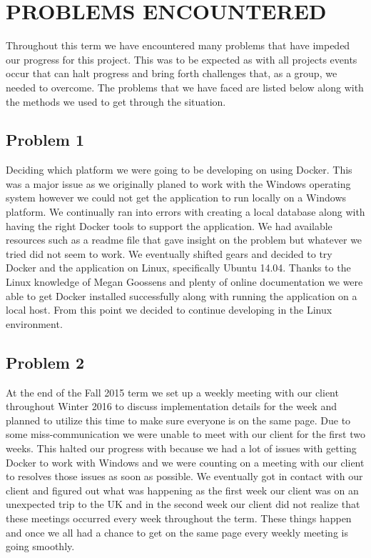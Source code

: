 \documentclass[letterpaper,10pt,onecolumn]{IEEEtran} %
\begin{document}
\section{PROBLEMS ENCOUNTERED}

Throughout this term we have encountered many problems that have impeded our progress for this project. This was to be expected as with all projects events occur that can halt progress and bring forth challenges that, as a group, we needed to overcome. The problems that we have faced are listed below along with the methods we used to get through the situation.

\subsection{Problem 1}
Deciding which platform we were going to be developing on using Docker. This was a major issue as we originally planed to work with the Windows operating system however we could not get the application to run locally on a Windows platform. We continually ran into errors with creating a local database along with having the right Docker tools to support the application. We had available resources such as a readme file that gave insight on the problem but whatever we tried did not seem to work. We eventually shifted gears and decided to try Docker and the application on Linux, specifically Ubuntu 14.04. Thanks to the Linux knowledge of Megan Goossens and plenty of online documentation we were able to get Docker installed successfully along with running the application on a local host. From this point we decided to continue developing in the Linux environment.

\subsection{Problem 2}
At the end of the Fall 2015 term we set up a weekly meeting with our client throughout Winter 2016 to discuss implementation details for the week and planned to utilize this time to make sure everyone is on the same page. Due to some miss-communication we were unable to meet with our client for the first two weeks. This halted our progress with because we had a lot of issues with getting Docker to work with Windows and we were counting on a meeting with our client to resolves those issues as soon as possible. We eventually got in contact with our client and figured out what was happening as the first week our client was on an unexpected trip to the UK and in the second week our client did not realize that these meetings occurred every week throughout the term. These things happen and once we all had a chance to get on the same page every weekly meeting is going smoothly.
\end{document}
